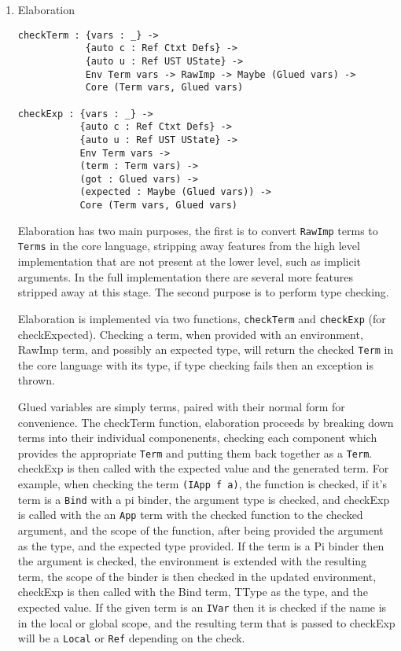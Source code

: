\documentclass[a4paper]{article}
\begin{document}
\begin{enumerate}
\item Elaboration
\label{sec:org3c636be}
\begin{center}
\begin{verbatim}
checkTerm : {vars : _} ->
			{auto c : Ref Ctxt Defs} ->
			{auto u : Ref UST UState} ->
			Env Term vars -> RawImp -> Maybe (Glued vars) ->
			Core (Term vars, Glued vars)

checkExp : {vars : _} ->
		   {auto c : Ref Ctxt Defs} ->
		   {auto u : Ref UST UState} ->
		   Env Term vars ->
		   (term : Term vars) ->
		   (got : Glued vars) ->
		   (expected : Maybe (Glued vars)) ->
		   Core (Term vars, Glued vars)
\end{verbatim}
\end{center}

Elaboration has two main purposes, the first is to convert \texttt{RawImp} terms
to \texttt{Terms} in the core language, stripping away features from the high 
level implementation that are not present at the lower level, such as 
implicit arguments. In the full implementation there are several more 
features stripped away at this stage. The second purpose is to perform 
type checking.  

Elaboration is implemented via two functions, \texttt{checkTerm} and \texttt{checkExp}
(for checkExpected). Checking a term, when provided with an environment,
RawImp term, and possibly an expected type, will return the checked 
\texttt{Term} in the core language with its type, if type checking fails then an
exception is thrown. 

Glued variables are simply terms, paired with their normal form for 
convenience. The checkTerm function, elaboration proceeds by breaking
down terms into their individual componenents, checking each component
which provides the appropriate \texttt{Term} and putting them back together as
a \texttt{Term}. checkExp is then called with the expected value and the 
generated term. For example, when checking the term \texttt{(IApp f a)}, 
the function is checked, if it's term is a \texttt{Bind} with a pi binder, 
the argument type is checked, and checkExp is called with the an \texttt{App} 
term with the checked function to the checked argument, and the scope
of the function, after being provided the argument as the type, 
and the expected type provided. If the term is a Pi binder then the 
argument is checked, the environment is extended with the resulting 
term, the scope of the binder is then checked in the updated 
environment, checkExp is then called with the Bind term, TType as the 
type, and the expected value. If the given term is an \texttt{IVar} 
then it is checked if the name is in the local or global scope, and the
resulting term that is passed to checkExp will be a \texttt{Local} or \texttt{Ref} 
depending on the check.


\end{enumerate}
\end{document}
